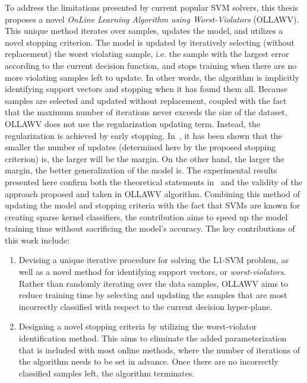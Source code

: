 \documentclass[reqno]{vcuthesis}
\newcommand{\iitem}{\item[-]}
\numberwithin{equation}{chapter}
\begin{document}
To address the limitations presented by current popular SVM solvers, this thesis proposes a novel \textit{OnLine Learning Algorithm using Worst-Violators} (OLLAWV). This unique method iterates over samples, updates the model, and utilizes a novel stopping criterion. The model is updated by iteratively selecting (without replacement) the worst violating sample, i.e. the sample with the largest error according to the current decision function, and stops training when there are no more violating samples left to update. In other words, the algorithm is implicitly identifying support vectors and stopping when it has found them all. Because samples are selected and updated without replacement, coupled with the fact that the maximum number of iterations never exceeds the size of the dataset, OLLAWV does not use the regularization updating term. Instead, the regularization is achieved by early stopping. In~\cite{collobert2004links}, it has been shown that the smaller the number of updates (determined here by the proposed stopping criterion) is, the larger will be the margin. On the other hand, the larger the margin, the better generalization of the model is. The experimental results presented here confirm both the theoretical statements in~\cite{collobert2004links} and the validity of the approach proposed and taken in OLLAWV algorithm. Combining this method of updating the model and stopping criteria with the fact that SVMs are known for creating sparse kernel classifiers, the contribution aims to speed up the model training time without sacrificing the model's accuracy. The key contributions of this work include:
\begin{enumerate}
\iitem Devising a unique iterative procedure for solving the L1-SVM problem, as well as a novel method for identifying support vectors, or \textit{worst-violators}. Rather than randomly iterating over the data samples, OLLAWV aims to reduce training time by selecting and updating the samples that are most incorrectly classified with respect to the current decision hyper-plane.

\iitem Designing a novel stopping criteria by utilizing the worst-violator identification method. This aims to eliminate the added parameterization that is included with most online methods, where the number of iterations of the algorithm needs to be set in advance. Once there are no incorrectly classified samples left, the algorithm terminates.
\end{enumerate}
\end{document}

